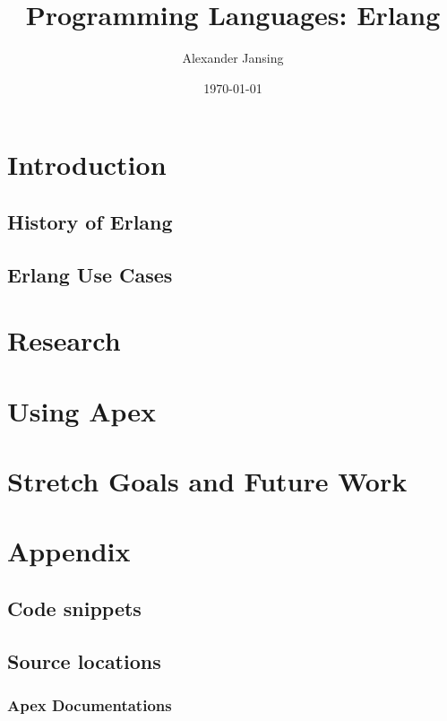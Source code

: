 \documentclass[11 pt]{IEEEtran}
\title{Programming Languages: Erlang}
\author{Alexander Jansing}
\date{\today}
\begin{document}
\maketitle


\section{Introduction}
\subsection{History of Erlang}
\subsection{Erlang Use Cases}
 

\section{Research}
 
\section{Using Apex}

\section{Stretch Goals and Future Work}


\newpage
\section{Appendix}
 
\subsection{Code snippets}

%


 \subsection{Source locations}
 
 \subsubsection{Apex Documentations}
\end{document}
